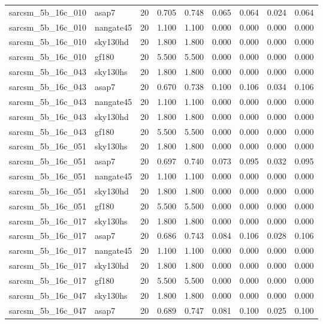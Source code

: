 \begin{tabular}{llrrrrrrr}
sarcsm\_5b\_16c\_010 & asap7 & 20 & 0.705 & 0.748 & 0.065 & 0.064 & 0.024 & 0.064 \\
sarcsm\_5b\_16c\_010 & nangate45 & 20 & 1.100 & 1.100 & 0.000 & 0.000 & 0.000 & 0.000 \\
sarcsm\_5b\_16c\_010 & sky130hd & 20 & 1.800 & 1.800 & 0.000 & 0.000 & 0.000 & 0.000 \\
sarcsm\_5b\_16c\_010 & gf180 & 20 & 5.500 & 5.500 & 0.000 & 0.000 & 0.000 & 0.000 \\
sarcsm\_5b\_16c\_043 & sky130hs & 20 & 1.800 & 1.800 & 0.000 & 0.000 & 0.000 & 0.000 \\
sarcsm\_5b\_16c\_043 & asap7 & 20 & 0.670 & 0.738 & 0.100 & 0.106 & 0.034 & 0.106 \\
sarcsm\_5b\_16c\_043 & nangate45 & 20 & 1.100 & 1.100 & 0.000 & 0.000 & 0.000 & 0.000 \\
sarcsm\_5b\_16c\_043 & sky130hd & 20 & 1.800 & 1.800 & 0.000 & 0.000 & 0.000 & 0.000 \\
sarcsm\_5b\_16c\_043 & gf180 & 20 & 5.500 & 5.500 & 0.000 & 0.000 & 0.000 & 0.000 \\
sarcsm\_5b\_16c\_051 & sky130hs & 20 & 1.800 & 1.800 & 0.000 & 0.000 & 0.000 & 0.000 \\
sarcsm\_5b\_16c\_051 & asap7 & 20 & 0.697 & 0.740 & 0.073 & 0.095 & 0.032 & 0.095 \\
sarcsm\_5b\_16c\_051 & nangate45 & 20 & 1.100 & 1.100 & 0.000 & 0.000 & 0.000 & 0.000 \\
sarcsm\_5b\_16c\_051 & sky130hd & 20 & 1.800 & 1.800 & 0.000 & 0.000 & 0.000 & 0.000 \\
sarcsm\_5b\_16c\_051 & gf180 & 20 & 5.500 & 5.500 & 0.000 & 0.000 & 0.000 & 0.000 \\
sarcsm\_5b\_16c\_017 & sky130hs & 20 & 1.800 & 1.800 & 0.000 & 0.000 & 0.000 & 0.000 \\
sarcsm\_5b\_16c\_017 & asap7 & 20 & 0.686 & 0.743 & 0.084 & 0.106 & 0.028 & 0.106 \\
sarcsm\_5b\_16c\_017 & nangate45 & 20 & 1.100 & 1.100 & 0.000 & 0.000 & 0.000 & 0.000 \\
sarcsm\_5b\_16c\_017 & sky130hd & 20 & 1.800 & 1.800 & 0.000 & 0.000 & 0.000 & 0.000 \\
sarcsm\_5b\_16c\_017 & gf180 & 20 & 5.500 & 5.500 & 0.000 & 0.000 & 0.000 & 0.000 \\
sarcsm\_5b\_16c\_047 & sky130hs & 20 & 1.800 & 1.800 & 0.000 & 0.000 & 0.000 & 0.000 \\
sarcsm\_5b\_16c\_047 & asap7 & 20 & 0.689 & 0.747 & 0.081 & 0.100 & 0.025 & 0.100 \\

\end{tabular}

